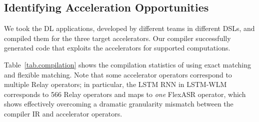 \subsection{Identifying Acceleration Opportunities}
\label{sec.compilation-stats}

%
We took the \AppNum DL applications, developed by different teams in different DSLs, and compiled them for the three target accelerators.
%
Our compiler successfully generated code that exploits the accelerators for supported computations.
%


Table~\ref{tab.compilation} shows the compilation statistics of using exact matching and flexible matching.
%
%
%
Note that some accelerator operators correspond to multiple Relay operators; in particular, 
the LSTM RNN in LSTM-WLM corresponds to 566 Relay operators 
and maps to \textit{one} FlexASR operator, which shows \TLA effectively overcoming a dramatic granularity mismatch between the compiler IR and accelerator operators.
%
%
%
%

